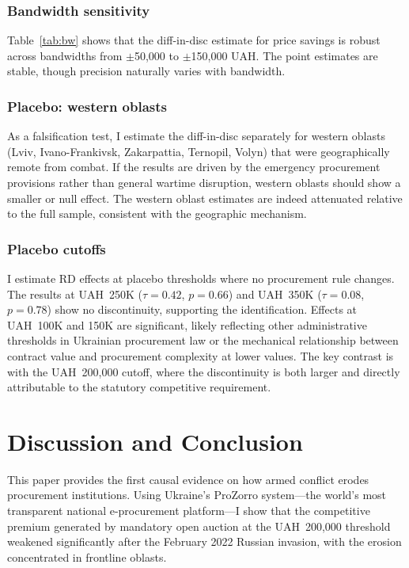 \documentclass[12pt]{article}
\begin{document}
\subsubsection*{Bandwidth sensitivity} Table~\ref{tab:bw} shows that the diff-in-disc estimate for price savings is robust across bandwidths from $\pm$50,000 to $\pm$150,000 UAH. The point estimates are stable, though precision naturally varies with bandwidth.



\subsubsection*{Placebo: western oblasts} As a falsification test, I estimate the diff-in-disc separately for western oblasts (Lviv, Ivano-Frankivsk, Zakarpattia, Ternopil, Volyn) that were geographically remote from combat. If the results are driven by the emergency procurement provisions rather than general wartime disruption, western oblasts should show a smaller or null effect. The western oblast estimates are indeed attenuated relative to the full sample, consistent with the geographic mechanism.

\subsubsection*{Placebo cutoffs} I estimate RD effects at placebo thresholds where no procurement rule changes. The results at UAH~250K ($\tau = 0.42$, $p = 0.66$) and UAH~350K ($\tau = 0.08$, $p = 0.78$) show no discontinuity, supporting the identification. Effects at UAH~100K and 150K are significant, likely reflecting other administrative thresholds in Ukrainian procurement law or the mechanical relationship between contract value and procurement complexity at lower values. The key contrast is with the UAH~200,000 cutoff, where the discontinuity is both larger and directly attributable to the statutory competitive requirement.


\section{Discussion and Conclusion}

This paper provides the first causal evidence on how armed conflict erodes procurement institutions. Using Ukraine's ProZorro system---the world's most transparent national e-procurement platform---I show that the competitive premium generated by mandatory open auction at the UAH~200,000 threshold weakened significantly after the February 2022 Russian invasion, with the erosion concentrated in frontline oblasts.
\end{document}
